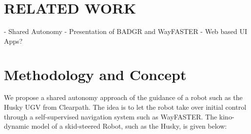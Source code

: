 \documentclass[letterpaper, 10 pt, conference]{ieeeconf}  %
\begin{document}
\section{RELATED WORK}
- Shared Autonomy
- Presentation of BADGR and WayFASTER
- Web based UI Apps?



\section{Methodology and Concept}
We propose a shared autonomy approach of the guidance of a robot such as the Husky UGV from Clearpath. 
The idea is to let the robot take over initial control through a self-supervised navigation system such as WayFASTER.
The kino-dynamic model of a skid-steered Robot, such as the Husky, is given below: \cite{wayfaster}

\vspace{-0.1in}

\end{document}
